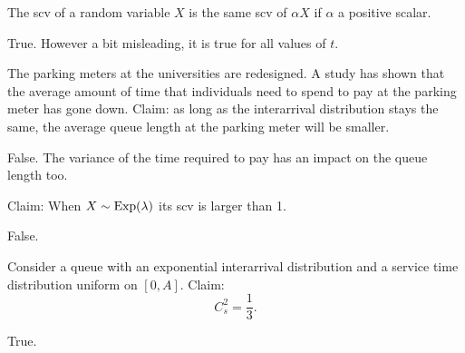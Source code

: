 \documentclass[stochastic-or.tex]{subfiles}
\begin{document}
\begin{truefalse}
The scv of a random variable $X$ is the same scv of $\alpha X$ if $\alpha$ a positive scalar.
    \begin{solution}
        True. However a bit misleading, it is true for all values of $t$.
    \end{solution}
\end{truefalse}

\begin{truefalse}
The parking meters at the universities are redesigned.
A study has shown that the average amount of time that individuals need to spend to pay at the parking  meter has gone down.
Claim: as long as the interarrival distribution stays the same, the average queue length at the parking meter will be smaller.
    \begin{solution}
        False.  The variance of the time required to pay has an impact on the queue length too.
    \end{solution}
\end{truefalse}

\begin{truefalse}
Claim: When $X\sim\mathrm{Exp}(\lambda)$ its scv is larger than 1.
\begin{solution} False.
\end{solution}
\end{truefalse}


\begin{truefalse}
    Consider a queue with an exponential interarrival distribution and a service time distribution uniform on $[0,A]$. Claim:
    \begin{equation*}
        C_s^2 = \frac 13.
    \end{equation*}

    \begin{solution}
        True.
    \end{solution}
\end{truefalse}
\end{document}
